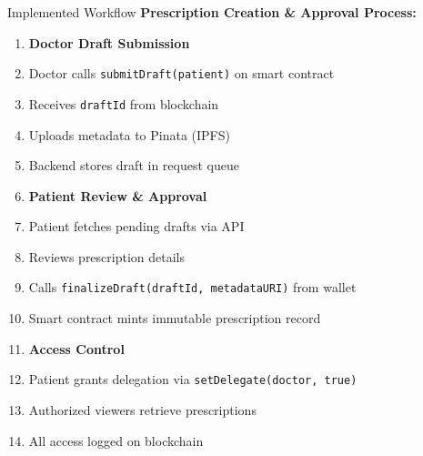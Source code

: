 \documentclass[10pt]{beamer}
\let\olditemize\itemize
\let\endolditemize\enditemize
\renewenvironment{itemize}
  {\olditemize\justifying}
  {\endolditemize}
\begin{document}
\begin{frame}{Implemented Workflow}
\textbf{Prescription Creation \& Approval Process:}

\begin{enumerate}
\item \textbf{Doctor Draft Submission}
    \begin{itemize}
    \item Doctor calls \texttt{submitDraft(patient)} on smart contract
    \item Receives \texttt{draftId} from blockchain
    \item Uploads metadata to Pinata (IPFS)
    \item Backend stores draft in request queue
    \end{itemize}

\item \textbf{Patient Review \& Approval}
    \begin{itemize}
    \item Patient fetches pending drafts via API
    \item Reviews prescription details
    \item Calls \texttt{finalizeDraft(draftId, metadataURI)} from wallet
    \item Smart contract mints immutable prescription record
    \end{itemize}

\item \textbf{Access Control}
    \begin{itemize}
    \item Patient grants delegation via \texttt{setDelegate(doctor, true)}
    \item Authorized viewers retrieve prescriptions
    \item All access logged on blockchain
    \end{itemize}
\end{enumerate}
\end{frame}
\end{document}
